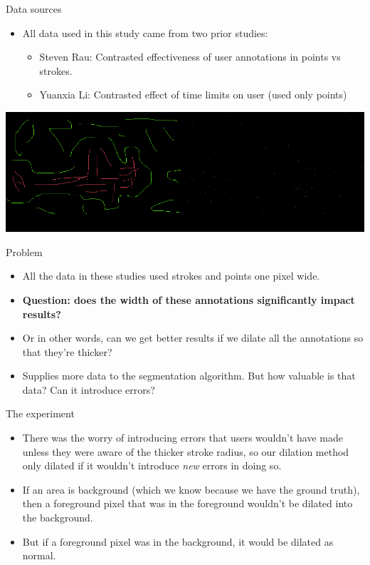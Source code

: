 \documentclass[14pt,xcolor=dvipsnames]{beamer}
\begin{document}
\begin{frame}[fragile,t]{Data sources}
	\begin{itemize}
		\item All data used in this study came from two prior studies:
		\begin{itemize}
			\item Steven Rau: Contrasted effectiveness of user annotations in points vs strokes.
			\item Yuanxia Li: Contrasted effect of time limits on user (used only points)
		\end{itemize}
	\end{itemize}
	\begin{center}
		\includegraphics[width=\paperheight]{strokes_vs_points}
	\end{center}
\end{frame}

\begin{frame}[fragile,t]{Problem}
	\begin{itemize}
		\item All the data in these studies used strokes and points one pixel wide.
		\item \textbf{Question: does the width of these annotations significantly impact results?}
		\item Or in other words, can we get better results if we dilate all the annotations so that they're thicker?
		\item Supplies more data to the segmentation algorithm. But how valuable is that data? Can it introduce errors?
	\end{itemize}
\end{frame}

\begin{frame}[fragile,t]{The experiment}
	\begin{itemize}
		\item There was the worry of introducing errors that users wouldn't have made unless they were aware of the thicker stroke radius, so our dilation method only dilated if it wouldn't introduce \textit{new} errors in doing so.
		\item If an area is background (which we know because we have the ground truth), then a foreground pixel that was in the foreground wouldn't be dilated into the background.
		\item But if a foreground pixel was in the background, it would be dilated as normal.
	\end{itemize}
\end{frame}
\end{document}
